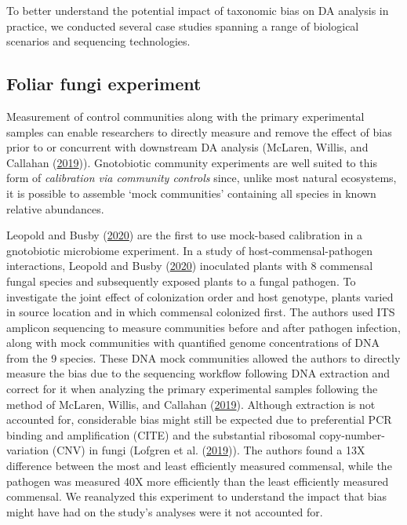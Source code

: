 \documentclass[
]{article}
\begin{document}
To better understand the potential impact of taxonomic bias on DA analysis in practice, we conducted several case studies spanning a range of biological scenarios and sequencing technologies.

\hypertarget{foliar-fungi-experiment}{%
\subsection{Foliar fungi experiment}\label{foliar-fungi-experiment}}

Measurement of control communities along with the primary experimental samples can enable researchers to directly measure and remove the effect of bias prior to or concurrent with downstream DA analysis (McLaren, Willis, and Callahan (\protect\hyperlink{ref-mclaren2019cons}{2019})).
Gnotobiotic community experiments are well suited to this form of \emph{calibration via community controls} since, unlike most natural ecosystems, it is possible to assemble `mock communities' containing all species in known relative abundances.

Leopold and Busby (\protect\hyperlink{ref-leopold2020host}{2020}) are the first to use mock-based calibration in a gnotobiotic microbiome experiment.
In a study of host-commensal-pathogen interactions, Leopold and Busby (\protect\hyperlink{ref-leopold2020host}{2020}) inoculated plants with 8 commensal fungal species and subsequently exposed plants to a fungal pathogen.
To investigate the joint effect of colonization order and host genotype, plants varied in source location and in which commensal colonized first.
The authors used ITS amplicon sequencing to measure communities before and after pathogen infection, along with mock communities with quantified genome concentrations of DNA from the 9 species.
These DNA mock communities allowed the authors to directly measure the bias due to the sequencing workflow following DNA extraction and correct for it when analyzing the primary experimental samples following the method of McLaren, Willis, and Callahan (\protect\hyperlink{ref-mclaren2019cons}{2019}).
Although extraction is not accounted for, considerable bias might still be expected due to preferential PCR binding and amplification (CITE) and the substantial ribosomal copy-number-variation (CNV) in fungi (Lofgren et al. (\protect\hyperlink{ref-lofgren2019geno}{2019})).
The authors found a 13X difference between the most and least efficiently measured commensal, while the pathogen was measured 40X more efficiently than the least efficiently measured commensal.
We reanalyzed this experiment to understand the impact that bias might have had on the study's analyses were it not accounted for.
\end{document}
